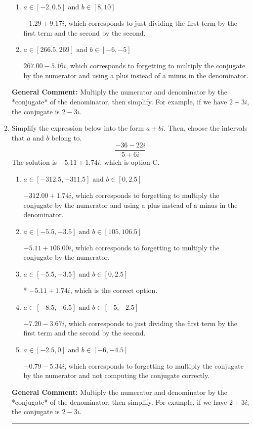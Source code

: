 \documentclass{extbook}[14pt]
\newcommand{\litem}[1]{\item #1

\rule{\textwidth}{0.4pt}}
\begin{document}
\begin{enumerate}
{\begin{enumerate}[label=\Alph*.]
 $-4.62  - 3.89 i$, which corresponds to forgetting to multiply the conjugate by the numerator and not computing the conjugate correctly.
\item \( a \in [-2, 0.5] \text{ and } b \in [8, 10] \)

 $-1.29  + 9.17 i$, which corresponds to just dividing the first term by the first term and the second by the second.
\item \( a \in [266.5, 269] \text{ and } b \in [-6, -5] \)

 $267.00  - 5.16 i$, which corresponds to forgetting to multiply the conjugate by the numerator and using a plus instead of a minus in the denominator.
\end{enumerate}

\textbf{General Comment:} Multiply the numerator and denominator by the *conjugate* of the denominator, then simplify. For example, if we have $2+3i$, the conjugate is $2-3i$.
}
\litem{
Simplify the expression below into the form $a+bi$. Then, choose the intervals that $a$ and $b$ belong to.
\[ \frac{-36 - 22 i}{5 + 6 i} \]The solution is \( -5.11  + 1.74 i \), which is option C.\begin{enumerate}[label=\Alph*.]
\item \( a \in [-312.5, -311.5] \text{ and } b \in [0, 2.5] \)

 $-312.00  + 1.74 i$, which corresponds to forgetting to multiply the conjugate by the numerator and using a plus instead of a minus in the denominator.
\item \( a \in [-5.5, -3.5] \text{ and } b \in [105, 106.5] \)

 $-5.11  + 106.00 i$, which corresponds to forgetting to multiply the conjugate by the numerator.
\item \( a \in [-5.5, -3.5] \text{ and } b \in [0, 2.5] \)

* $-5.11  + 1.74 i$, which is the correct option.
\item \( a \in [-8.5, -6.5] \text{ and } b \in [-5, -2.5] \)

 $-7.20  - 3.67 i$, which corresponds to just dividing the first term by the first term and the second by the second.
\item \( a \in [-2.5, 0] \text{ and } b \in [-6, -4.5] \)

 $-0.79  - 5.34 i$, which corresponds to forgetting to multiply the conjugate by the numerator and not computing the conjugate correctly.
\end{enumerate}

\textbf{General Comment:} Multiply the numerator and denominator by the *conjugate* of the denominator, then simplify. For example, if we have $2+3i$, the conjugate is $2-3i$.
}
\end{enumerate}
\end{document}
